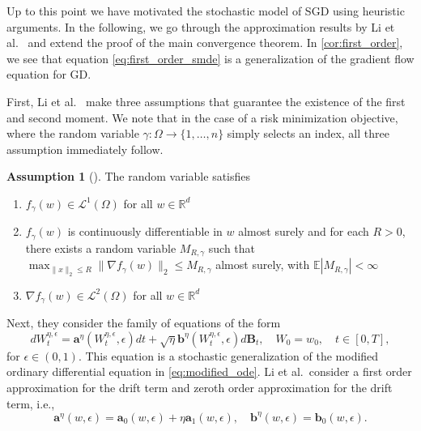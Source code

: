 \documentclass[12pt]{article}
\theoremstyle{definition}
\newtheorem{assumption}[assumption]{Assumption}
\numberwithin{equation}{section}
\newcommand{\R}{\mathbb{R}}
\newcommand{\norm}[1]{\lVert{#1}\rVert_2}
\begin{document}
Up to this point we have motivated the stochastic model of SGD using heuristic arguments. In the following, we go through the approximation results by Li et al.\ \cite{liStochasticModifiedEquations2019} and extend the proof of the main convergence theorem.
In \autoref{cor:first_order}, we see that equation \eqref{eq:first_order_smde} is a generalization of the gradient flow equation for GD. 

First, Li et al.\ \cite{liStochasticModifiedEquations2019} make three assumptions that guarantee the existence of the first and second moment. We note that in the case of a risk minimization objective, where the random variable $\gamma:\Omega \rightarrow \{1,\dots,n\}$ simply selects an index, all three assumption immediately follow.
\begin{assumption}[]
  \label{as:sde_model}
  The random variable satisfies 
  \begin{enumerate}[label=(\roman*)]
    \item $f_{\gamma}(w) \in \mathcal{L}^1(\Omega)$ for all $w \in \R^d$
    \item \label{as:bounded_gradient} $f_{\gamma}(w)$ is continuously differentiable in $w$ almost surely and for each $R > 0$, there exists a random variable $M_{R,\gamma}$ such that $\max_{\norm{x} \leq R} \norm{ \nabla f_{\gamma}(w) } \leq M_{R,\gamma}$ almost surely, with $\mathbb{E} |M_{R,\gamma}| < \infty$
    \item $\nabla f_{\gamma}(w) \in \mathcal{L}^2(\Omega)$ for all $w \in \R^d$
  \end{enumerate}
\end{assumption}

Next, they consider the family of equations of the form
\begin{equation}
  \label{eq:general_sde}
  dW^{\eta, \epsilon}_t = \mathbf{a}^\eta(W^{\eta, \epsilon}_t,\epsilon)dt + \sqrt{\eta}\mathbf{b}^\eta(W^{\eta, \epsilon}_t, \epsilon)d\mathbf{B}_t, \quad W_0 = w_0, \quad t \in [0,T],
\end{equation}
for $\epsilon \in (0,1)$. 
This equation is a stochastic generalization of the modified ordinary differential equation in \eqref{eq:modified_ode}. Li et al.\ consider a first order approximation for the drift term and zeroth order approximation for the drift term, i.e.,
\begin{equation}
  \mathbf{a}^\eta(w, \epsilon) = \mathbf{a}_0(w, \epsilon) + \eta \mathbf{a}_1(w, \epsilon), \quad \mathbf{b}^\eta(w, \epsilon) = \mathbf{b}_0(w, \epsilon).
\end{equation}
\end{document}
